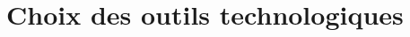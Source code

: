 \chapter{Choix des outils technologiques}
    
    \newpage
    
    \newpage
    
    \newpage
    
    \newpage
    
    \newpage
    
    \newpage
    



